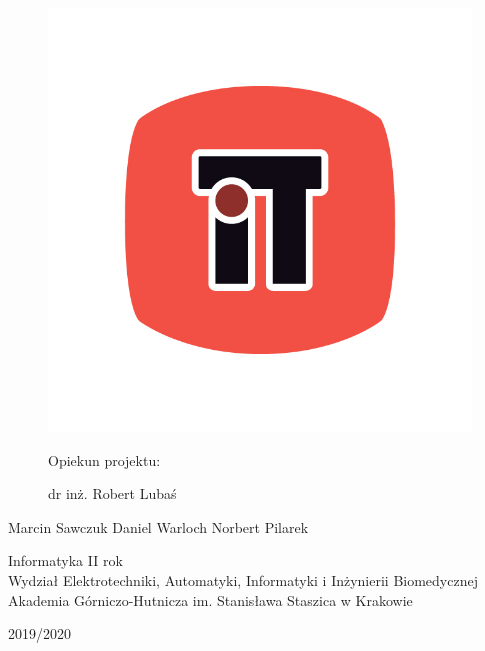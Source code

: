 \documentclass{article}
\begin{document}
\begin{figure}[h]
        \includegraphics[scale = 0.65]{IT.jpg}
        
        \vspace{15mm}
        
        \centering
        \large Opiekun projektu:
        
        \Large dr inż. Robert Lubaś
    \end{figure}
    
    \vspace{25mm}
    \begin{center}
        \Large{Marcin Sawczuk \hspace{5mm} Daniel Warloch \hspace{5mm} Norbert Pilarek }
    \end{center}
    \vspace{12mm}
    \begin{center}
        \large{Informatyka II rok \\ Wydział Elektrotechniki, Automatyki,
        Informatyki i Inżynierii Biomedycznej \\
        Akademia Górniczo-Hutnicza im. Stanisława Staszica
        w Krakowie} 
        
        \medskip
        \Large{2019/2020}
    \end{center}
    
    \pagebreak
    \tableofcontents
    \pagebreak
\end{document}
